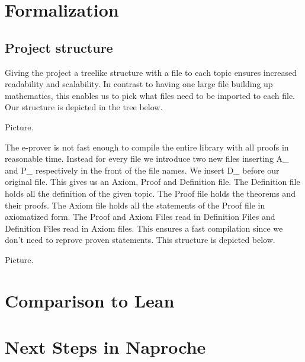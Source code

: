 \documentclass[11pt]{article}
\begin{document}
\newpage

\section{Formalization}
\subsection{Project structure}
Giving the project a treelike structure with a file to each topic ensures increased readability and scalability. 
In contrast to having one large file building up mathematics, this enables us to pick what files need to be imported to each file. 
Our structure is depicted in the tree below.

Picture.

The e-prover is not fast enough to compile the entire library with all proofs in reasonable time. 
Instead for every file we introduce two new files inserting A\_ and P\_ respectively in the front of the file names. We insert D\_ before our original file. This gives us an Axiom, Proof and Definition file. 
The Definition file holds all the definition of the given topic. 
The Proof file holds the theorems and their proofs. The Axiom file holds all the statements of the Proof file in axiomatized form. 
The Proof and Axiom Files read in Definition Files and Definition Files read in Axiom files. 
This ensures a fast compilation since we don't need to reprove proven statements. 
This structure is depicted below.

Picture.
\section{Comparison to Lean}


\section{Next Steps in Naproche}
\end{document}
